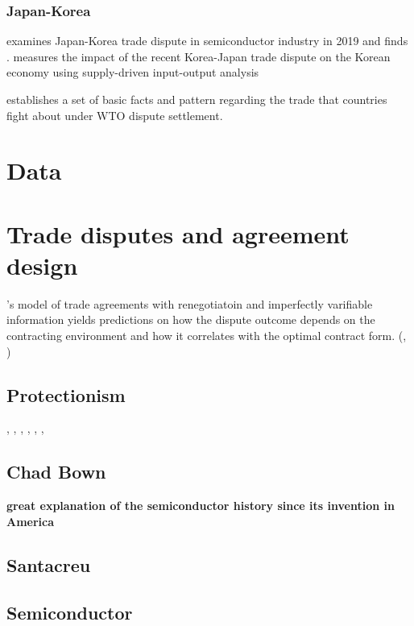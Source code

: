 \documentclass[10pt]{article} %
\begin{document}
        \subsubsection{Japan-Korea}
        \cite{MakiokaZhang2023} examines Japan-Korea trade dispute in semiconductor industry in 2019 and finds .
        \cite{Kim2021} measures the impact of the recent Korea-Japan trade dispute on the Korean economy using supply-driven input-output analysis
    

    \cite{BownReynolds2014} establishes a set of basic facts and pattern regarding the trade that countries fight about under WTO dispute settlement.


\section{Data}

\section{Trade disputes and agreement design}
\cite{MaggiStaiger2018}'s model of trade agreements with renegotiatoin and imperfectly varifiable information yields predictions on how the dispute outcome depends on the contracting environment and how it correlates with the optimal contract form. (\cite{MaggiStaiger2011}, \cite{MaggiStaiger2015})

\subsection{Protectionism}
\cite{Mayer1984}, \cite{GrossmanHelpman1994}, \cite{GrossmanHelpman1995}, \cite{GrossmanHelpman1996}, \cite{GoldbergMaggi1999}, \cite{GawandeBandyopadhyay2000}, \cite{EderingtonMinier2008}

\subsection{Chad Bown}
\textbf{great explanation of the semiconductor history since its invention in America \cite{Bown2020}}

\subsection{Santacreu}
\cite{Santacreu2022}

\subsection{Semiconductor}
\end{document}
